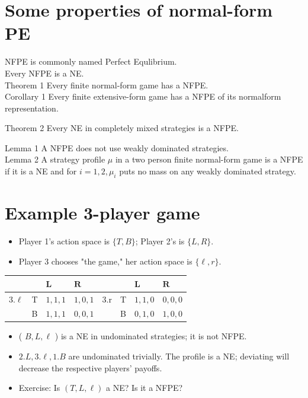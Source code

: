 \documentclass[10pt]{article}
\begin{document}
\section*{Some properties of normal-form PE}
NFPE is commonly named Perfect Equlibrium.\\
Every NFPE is a NE.\\
Theorem 1 Every finite normal-form game has a NFPE.\\
Corollary 1 Every finite extensive-form game has a NFPE of its normalform representation.

Theorem 2 Every NE in completely mixed strategies is a NFPE.

Lemma 1 A NFPE does not use weakly dominated strategies.\\
Lemma 2 A strategy profile $\mu$ in a two person finite normal-form game is a NFPE if it is a NE and for $i=1,2, \mu_{i}$ puts no mass on any weakly dominated strategy.

\section*{Example 3-player game}
\begin{itemize}
  \item Player 1's action space is $\{T, B\}$; Player 2's is $\{L, R\}$.
  \item Player 3 chooses "the game," her action space is $\{\ell, r\}$.
\end{itemize}

\begin{center}
\begin{tabular}{llllllll}
 &  & $\mathbf{L}$ & $\mathbf{R}$ &  &  & $\mathbf{L}$ & $\mathbf{R}$ \\
\hline
$3 . \ell$ & T & $1,1,1$ & $1,0,1$ & $3 . \mathrm{r}$ & T & $1,1,0$ & $0,0,0$ \\
\hline
 & B & $1,1,1$ & $0,0,1$ &  & B & $0,1,0$ & $1,0,0$ \\
\hline
\end{tabular}
\end{center}

\begin{itemize}
  \item ( $B, L, \ell$ ) is a NE in undominated strategies; it is not NFPE.
  \item $2 . L, 3 . \ell, 1 . B$ are undominated trivially. The profile is a NE; deviating will decrease the respective players' payoffs.
  \item Exercise: Is $(T, L, \ell)$ a NE? Is it a NFPE?
\end{itemize}
\end{document}

